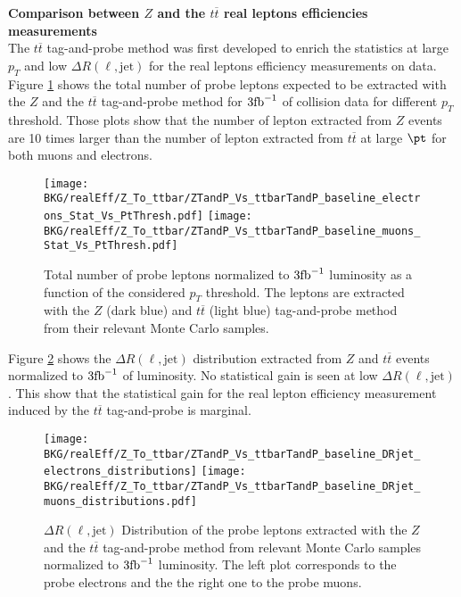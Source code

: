 	\par{\bf Comparison between $Z$ and the $t\overline{t}$ real leptons efficiencies measurements\\}
		The $t\overline{t}$ tag-and-probe method was first developed to enrich the statistics at large $p_T$ and low $\Delta R(\ell,\mathrm{jet})$ for the real leptons efficiency measurements on data. Figure \ref{fig:Z_Vs_ttbar_Cumul_pt_distributions} shows the total number of probe leptons expected to be extracted with the $Z$ and the $t\overline{t}$ tag-and-probe method for $3\textnormal{fb}^{-1}$ of collision data for different $p_T$ threshold. Those plots show that the number of lepton extracted from $Z$ events are 10 times larger than the number of lepton extracted from $t\overline{t}$ at large $\pt$ for both muons and electrons. 
		
	\begin{figure}[!htb]
	  \begin{center} 
	   \texttt{[image: BKG/realEff/Z\_To\_ttbar/ZTandP\_Vs\_ttbarTandP\_baseline\_electrons\_Stat\_Vs\_PtThresh.pdf]} 
	   \texttt{[image: BKG/realEff/Z\_To\_ttbar/ZTandP\_Vs\_ttbarTandP\_baseline\_muons\_Stat\_Vs\_PtThresh.pdf]}
	   \caption{\label{fig:Z_Vs_ttbar_Cumul_pt_distributions} Total number of probe leptons normalized to $3\textnormal{fb}^{-1}$ luminosity as a function of the considered $p_T$ threshold. The leptons are extracted with the $Z$ (dark blue) and $t\overline{t}$ (light blue) tag-and-probe method from their relevant Monte Carlo samples.}
	  \end{center}
	\end{figure}	
		
		Figure \ref{fig:Z_Vs_ttbar_DRjet_distributions} shows the $\Delta R(\ell,\mathrm{jet})$ distribution extracted from $Z$ and $t\overline{t}$ events normalized to $3\textnormal{fb}^{-1}$ of luminosity. No statistical gain is seen at low $\Delta R(\ell,\mathrm{jet})$. This show that the statistical gain for the real lepton efficiency measurement induced by the $t\overline{t}$ tag-and-probe is marginal.\\ 
		
		
	\begin{figure}[!htb]
	  \begin{center} 
	   \texttt{[image: BKG/realEff/Z\_To\_ttbar/ZTandP\_Vs\_ttbarTandP\_baseline\_DRjet\_electrons\_distributions]} 
	   \texttt{[image: BKG/realEff/Z\_To\_ttbar/ZTandP\_Vs\_ttbarTandP\_baseline\_DRjet\_muons\_distributions.pdf]}
	   \caption{\label{fig:Z_Vs_ttbar_DRjet_distributions} $\Delta R(\ell,\mathrm{jet})$ Distribution of the probe leptons extracted with the $Z$ and the $t\overline{t}$ tag-and-probe method from relevant Monte Carlo samples normalized to $3\textnormal{fb}^{-1}$ luminosity. The left plot corresponds to the probe electrons and the the right one to the probe muons.}
	  \end{center}
	\end{figure}	


